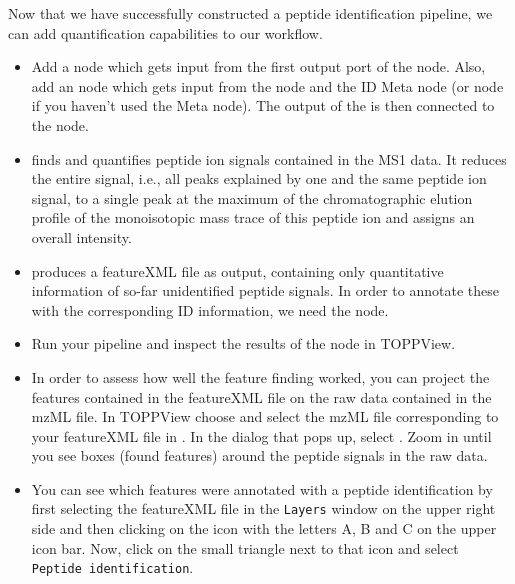 Now that we have successfully constructed a peptide identification pipeline, we can add quantification capabilities to our workflow.

\begin{itemize}
\item
Add a  node  which gets input from the first output port of the  node. Also, add an  node  which gets input from the  node and the ID Meta node (or  node if you haven't used the Meta node).
The output of the  is then connected to the  node.
\item
{} finds and quantifies peptide ion signals contained in the MS1 data.
It reduces the entire signal, i.e., all peaks explained by one and the same peptide ion signal, to a single peak at the maximum of the chromatographic elution profile of the monoisotopic mass trace of this peptide ion and assigns an overall intensity.
\item
{} produces a featureXML file as output, containing only quantitative information of so-far unidentified peptide signals.
In order to annotate these with the corresponding ID information, we need the  node.
\item Run your pipeline and inspect the results of the  node in TOPPView.
\item In order to assess how well the feature finding worked, you can project the features contained in the featureXML file on the raw data contained in the mzML file.
In TOPPView choose  and select the mzML file corresponding to your featureXML file in .
In the dialog that pops up, select .
Zoom in until you see boxes (found features) around the peptide signals in the raw data.
\item
You can see which features were annotated with a peptide identification by first selecting the featureXML file in the \texttt{Layers} window on the upper right side and then clicking on the icon with the letters A, B and C on the upper icon bar.
Now, click on the small triangle next to that icon and select \texttt{Peptide identification}.
\end{itemize}

